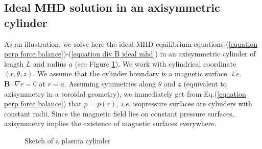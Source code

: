 \documentclass[my_thesis.tex]{subfiles}
\begin{document}
\subsection{Ideal MHD solution in an axisymmetric cylinder}\label{appendix jxb=grad p solution}
As an illustration, we solve here the ideal MHD equilibrium equations (\ref{equation perp force balance})-(\ref{equation div B ideal mhd}) in an axisymmetric cylinder of length $L$ and radius $a$ (see Figure \ref{fig. cylinder sketch}). We work with cylindrical coordinate $(r,\theta,z)$. We assume that the cylinder boundary is a magnetic surface, \textit{i.e.} $\mathbf{B}\cdot\nabla r=0$ at $r=a$. Assuming symmetries along $\theta$ and $z$ (equivalent to axisymmetry in a toroidal geometry), we immediately get from Eq.(\ref{equation perp force balance}) that $p=p(r)$, \textit{i.e.} isopressure surfaces are cylinders with constant radii. Since the magnetic field lies on constant pressure surfaces, axisymmetry implies the existence of magnetic surfaces everywhere.

\begin{figure}
	\centering
	\caption{Sketch of a plasma cylinder}
	\label{fig. cylinder sketch}
\end{figure}
\end{document}
